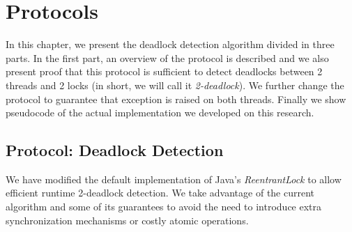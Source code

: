\chapter{Protocols}

In this chapter, we present the deadlock detection algorithm divided in three parts. In the first part, an overview of the protocol is described and we also present proof that this protocol is sufficient to detect deadlocks between 2 threads and 2 locks (in short, we will call it \emph{2-deadlock}). We further change the protocol to guarantee that exception is raised on both threads. Finally we show pseudocode of the actual implementation we developed on this research.

\section{Protocol: Deadlock Detection}
We have modified the default implementation of Java's \emph{ReentrantLock} to allow efficient runtime 2-deadlock detection. We take advantage of the current algorithm and some of its guarantees to avoid the need to introduce extra synchronization mechanisms or costly atomic operations.

